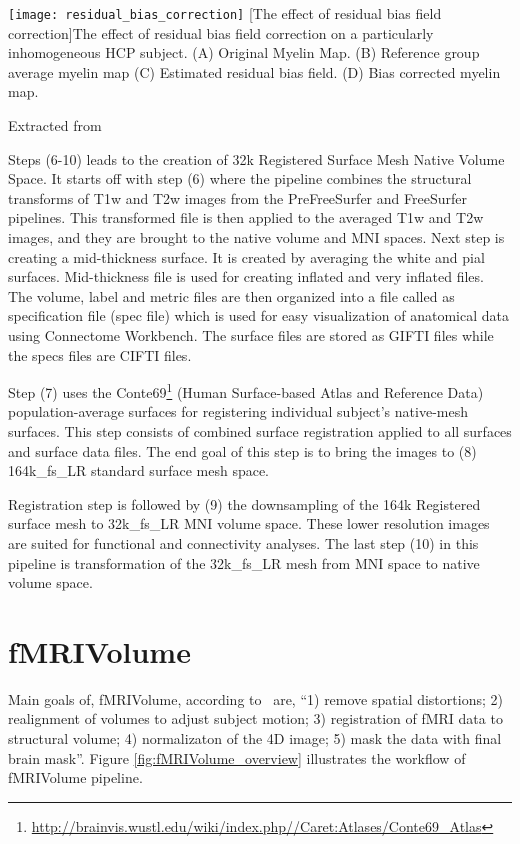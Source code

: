 \begin{center}
  \texttt{[image: residual\_bias\_correction]}
  [The effect of residual bias field correction]{The effect of residual bias field correction on a particularly inhomogeneous HCP subject. (A) Original Myelin Map. (B) Reference group average myelin map (C) Estimated residual bias field. (D) Bias corrected myelin map.}
  \label{fig:residual_bias_correction}
  \caption*{Extracted from \cite{Gla13}}
\end{center}

Steps (6-10) leads to the creation of 32k Registered Surface Mesh Native Volume Space. It starts off with step (6) where the pipeline combines the structural transforms of T1w and T2w images from the PreFreeSurfer and FreeSurfer pipelines. This transformed file is then applied to the averaged T1w and T2w images, and they are brought to the native volume and MNI spaces. Next step is creating a mid-thickness surface. It is created by averaging the white and pial surfaces. Mid-thickness file is used for creating inflated and very inflated files. The volume, label and metric files are then organized into a file called as specification file (spec file) which is used for easy visualization of anatomical data using Connectome Workbench. The surface files are stored as GIFTI files while the specs files are CIFTI files.

Step (7) uses the Conte69\footnote{\url{http://brainvis.wustl.edu/wiki/index.php//Caret:Atlases/Conte69\_Atlas}} (Human Surface-based Atlas and Reference Data) population-average surfaces for registering individual subject's native-mesh surfaces. This step consists of combined surface registration applied to all surfaces and surface data files. The end goal of this step is to bring the images to (8) 164k\_fs\_LR standard surface mesh space. 

Registration step is followed by (9) the downsampling of the 164k Registered surface mesh to 32k\_fs\_LR MNI volume space. These lower resolution images are suited for functional and connectivity analyses. The last step (10) in this pipeline is transformation of the 32k\_fs\_LR mesh from MNI space to native volume space. 


\section{fMRIVolume} \label{sec:fMRIVolume}
Main goals of, fMRIVolume, according to~\cite{Gla13} are, ``1) remove spatial distortions; 2) realignment of volumes to adjust subject motion; 3) registration of fMRI data to structural volume; 4) normalizaton of the 4D image; 5) mask the data with final brain mask''. Figure \ref{fig:fMRIVolume_overview} illustrates the workflow of fMRIVolume pipeline.


